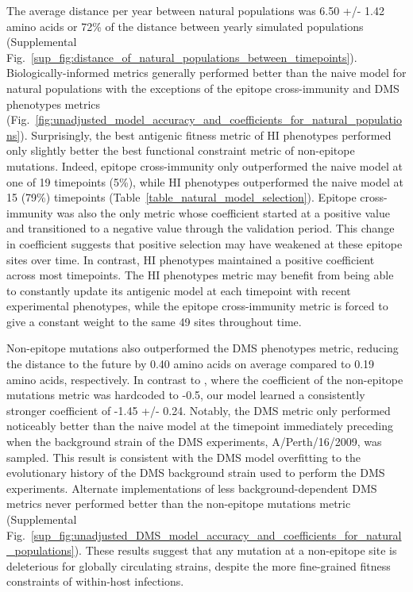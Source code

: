 The average distance per year between natural populations was 6.50 +/- 1.42 amino acids or 72\% of the distance between yearly simulated populations (Supplemental Fig.~\ref{sup_fig:distance_of_natural_populations_between_timepoints}).
Biologically-informed metrics generally performed better than the naive model for natural populations with the exceptions of the epitope cross-immunity and DMS phenotypes metrics (Fig.~\ref{fig:unadjusted_model_accuracy_and_coefficients_for_natural_populations}).
Surprisingly, the best antigenic fitness metric of HI phenotypes performed only slightly better the best functional constraint metric of non-epitope mutations.
Indeed, epitope cross-immunity only outperformed the naive model at one of 19 timepoints (5\%), while HI phenotypes outperformed the naive model at 15 (79\%) timepoints (Table~\ref{table_natural_model_selection}).
Epitope cross-immunity was also the only metric whose coefficient started at a positive value and transitioned to a negative value through the validation period.
This change in coefficient suggests that positive selection may have weakened at these epitope sites over time.
In contrast, HI phenotypes maintained a positive coefficient across most timepoints.
The HI phenotypes metric may benefit from being able to constantly update its antigenic model at each timepoint with recent experimental phenotypes, while the epitope cross-immunity metric is forced to give a constant weight to the same 49 sites throughout time.

Non-epitope mutations also outperformed the DMS phenotypes metric, reducing the distance to the future by 0.40 amino acids on average compared to 0.19 amino acids, respectively.
In contrast to \cite{Luksza:2014hj}, where the coefficient of the non-epitope mutations metric was hardcoded to -0.5, our model learned a consistently stronger coefficient of -1.45 +/- 0.24.
Notably, the DMS metric only performed noticeably better than the naive model at the timepoint immediately preceding when the background strain of the DMS experiments, A/Perth/16/2009, was sampled.
This result is consistent with the DMS model overfitting to the evolutionary history of the DMS background strain used to perform the DMS experiments.
Alternate implementations of less background-dependent DMS metrics never performed better than the non-epitope mutations metric (Supplemental Fig.~\ref{sup_fig:unadjusted_DMS_model_accuracy_and_coefficients_for_natural_populations}).
These results suggest that any mutation at a non-epitope site is deleterious for globally circulating strains, despite the more fine-grained fitness constraints of within-host infections.

